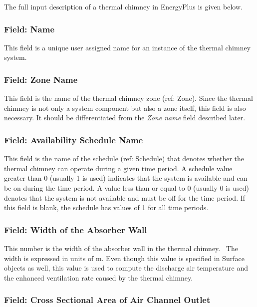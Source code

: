 The full input description of a thermal chimney in EnergyPlus is given below.

\subsubsection{Field: Name}\label{field-name-9-002}

This field is a unique user assigned name for an instance of the thermal chimney system.

\subsubsection{Field: Zone Name}\label{field-zone-name-7}

This field is the name of the thermal chimney zone (ref: Zone). Since the thermal chimney is not only a system component but also a zone itself, this field is also necessary. It should be differentiated from the \emph{Zone name} field described later.

\subsubsection{Field: Availability Schedule Name}\label{field-availability-schedule-name-1-000}

This field is the name of the schedule (ref: Schedule) that denotes whether the thermal chimney can operate during a given time period. A schedule value greater than 0 (usually 1 is used) indicates that the system is available and can be on during the time period. A value less than or equal to 0 (usually 0 is used) denotes that the system is not available and must be off for the time period. If this field is blank, the schedule has values of 1 for all time periods.

\subsubsection{Field: Width of the Absorber Wall}\label{field-width-of-the-absorber-wall}

This number is the width of the absorber wall in the thermal chimney.~ The width is expressed in units of m. Even though this value is specified in Surface objects as well, this value is used to compute the discharge air temperature and the enhanced ventilation rate caused by the thermal chimney.

\subsubsection{Field: Cross Sectional Area of Air Channel Outlet}\label{field-cross-sectional-area-of-air-channel-outlet}

